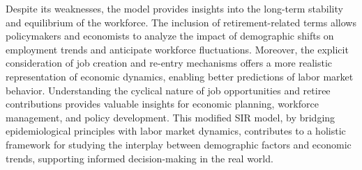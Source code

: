 \documentclass[11pt]{amsart}
\begin{document}
Despite its weaknesses, the model provides insights into the long-term stability and equilibrium of the workforce. 
The inclusion of retirement-related terms allows policymakers and economists to analyze the impact of demographic shifts on employment trends and anticipate 
workforce fluctuations. Moreover, the explicit consideration of job creation and re-entry mechanisms offers a more realistic representation of economic dynamics, 
enabling better predictions of labor market behavior. Understanding the cyclical nature of job opportunities and retiree contributions provides valuable insights 
for economic planning, workforce management, and policy development. This modified SIR model, by bridging epidemiological principles with labor market dynamics, 
contributes to a holistic framework for studying the interplay between demographic factors and economic trends, supporting informed decision-making in the real world.



\newpage 


\end{document}
